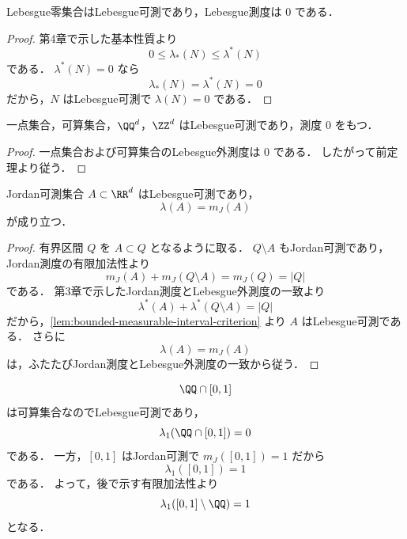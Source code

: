 \begin{theorem}[Lebesgue零集合]
Lebesgue零集合はLebesgue可測であり，Lebesgue測度は $0$ である．
\end{theorem}
\begin{proof}
第4章で示した基本性質より
\[
0\le \lambda_*(N)\le \lambda^*(N)
\]
である．
$\lambda^*(N)=0$ なら
\[
\lambda_*(N)=\lambda^*(N)=0
\]
だから，$N$ はLebesgue可測で $\lambda(N)=0$ である．
\end{proof}

\begin{corollary}[可算集合]
一点集合，可算集合，$\QQ^d$，$\ZZ^d$ はLebesgue可測であり，測度 $0$ をもつ．
\end{corollary}
\begin{proof}
一点集合および可算集合のLebesgue外測度は $0$ である．
したがって前定理より従う．
\end{proof}

\begin{theorem}[Jordan可測集合]
Jordan可測集合 $A\subset\RR^d$ はLebesgue可測であり，
\[
\lambda(A)=m_J(A)
\]
が成り立つ．
\end{theorem}
\begin{proof}
有界区間 $Q$ を $A\subset Q$ となるように取る．
$Q\setminus A$ もJordan可測であり，Jordan測度の有限加法性より
\[
m_J(A)+m_J(Q\setminus A)=m_J(Q)=|Q|
\]
である．
第3章で示したJordan測度とLebesgue外測度の一致より
\[
\lambda^*(A)+\lambda^*(Q\setminus A)=|Q|
\]
だから，\cref{lem:bounded-measurable-interval-criterion} より $A$ はLebesgue可測である．
さらに
\[
\lambda(A)=m_J(A)
\]
は，ふたたびJordan測度とLebesgue外測度の一致から従う．
\end{proof}

\begin{example}
\[
\QQ\cap[0,1]
\]
は可算集合なのでLebesgue可測であり，
\[
\lambda_1(\QQ\cap[0,1])=0
\]
である．
一方，$[0,1]$ はJordan可測で $m_J([0,1])=1$ だから
\[
\lambda_1([0,1])=1
\]
である．
よって，後で示す有限加法性より
\[
\lambda_1([0,1]\setminus\QQ)=1
\]
となる．
\end{example}



